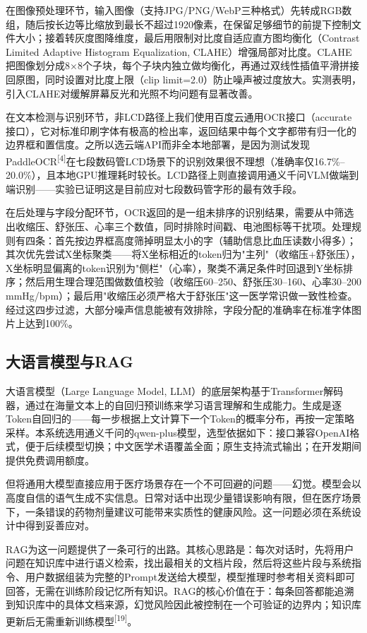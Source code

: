 \documentclass[zihao=-4,a4paper]{ctexart}
\begin{document}
在图像预处理环节，输入图像（支持JPG/PNG/WebP三种格式）先转成RGB数组，随后按长边等比缩放到最长不超过1920像素，在保留足够细节的前提下控制文件大小；接着转灰度图降维度，最后用限制对比度自适应直方图均衡化（Contrast Limited Adaptive Histogram Equalization, CLAHE）增强局部对比度。CLAHE把图像划分成8×8个子块，每个子块内独立做均衡化，再通过双线性插值平滑拼接回原图，同时设置对比度上限（clip limit=2.0）防止噪声被过度放大。实测表明，引入CLAHE对缓解屏幕反光和光照不均问题有显著改善。

在文本检测与识别环节，非LCD路径上我们使用百度云通用OCR接口（accurate接口），它对标准印刷字体有极高的检出率，返回结果中每个文字都带有归一化的边界框和置信度。之所以选云端API而非全本地部署，是因为测试发现PaddleOCR\textsuperscript{[4]}在七段数码管LCD场景下的识别效果很不理想（准确率仅16.7\%--20.0\%），且本地GPU推理耗时较长。LCD路径上则直接调用通义千问VLM做端到端识别——实验已证明这是目前应对七段数码管字形的最有效手段。

在后处理与字段分配环节，OCR返回的是一组未排序的识别结果，需要从中筛选出收缩压、舒张压、心率三个数值，同时排除时间戳、电池图标等干扰项。处理规则有四条：首先按边界框高度筛掉明显太小的字（辅助信息比血压读数小得多）；其次优先尝试X坐标聚类——将X坐标相近的token归为"主列"（收缩压+舒张压），X坐标明显偏离的token识别为"侧栏"（心率），聚类不满足条件时回退到Y坐标排序；然后用生理合理范围做数值校验（收缩压60--250、舒张压30--160、心率30--200 mmHg/bpm）；最后用"收缩压必须严格大于舒张压"这一医学常识做一致性检查。经过这四步过滤，大部分噪声信息能被有效排除，字段分配的准确率在标准字体图片上达到100\%。

\subsection{大语言模型与RAG}

大语言模型（Large Language Model, LLM）的底层架构基于Transformer解码器，通过在海量文本上的自回归预训练来学习语言理解和生成能力。生成是逐Token自回归的——每一步根据上文计算下一个Token的概率分布，再按一定策略采样。本系统选用通义千问的qwen-plus模型，选型依据如下：接口兼容OpenAI格式，便于后续模型切换；中文医学术语覆盖全面；原生支持流式输出；在开发期间提供免费调用额度。

但将通用大模型直接应用于医疗场景存在一个不可回避的问题——幻觉。模型会以高度自信的语气生成不实信息。日常对话中出现少量错误影响有限，但在医疗场景下，一条错误的药物剂量建议可能带来实质性的健康风险。这一问题必须在系统设计中得到妥善应对。

RAG为这一问题提供了一条可行的出路。其核心思路是：每次对话时，先将用户问题在知识库中进行语义检索，找出最相关的文档片段，然后将这些片段与系统指令、用户数据组装为完整的Prompt发送给大模型，模型推理时参考相关资料即可回答，无需在训练阶段记忆所有知识。RAG的核心价值在于：每条回答都能追溯到知识库中的具体文档来源，幻觉风险因此被控制在一个可验证的边界内；知识库更新后无需重新训练模型\textsuperscript{[19]}。
\end{document}
